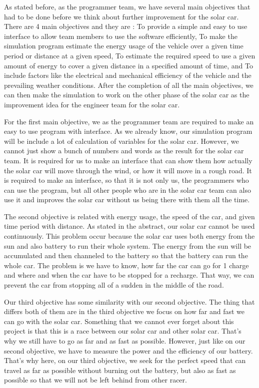 \documentclass[journal, 10pt, draftclsnofoot, onecolumn]{IEEEtran}
\begin{document}
	As stated before, as the programmer team, we have several main objectives that had to be done before we think about further improvement for the solar car. There are 4 main objectives and they are : To provide a simple and easy to use interface to allow team members to use the software efficiently, To make the simulation program estimate the energy usage of the vehicle over a given time period or distance at a given speed, To estimate the required speed to use a given amount of energy to cover a given distance in a specified amount of time, and To include factors like the electrical and mechanical efficiency of the vehicle and the prevailing weather conditions. After the completion of all the main objectives, we can then make the simulation to work on the other phase of the solar car as the improvement idea for the engineer team for the solar car. 

	For the first main objective, we as the programmer team are required to make an easy to use program with interface. As we already know, our simulation program will be include a lot of calculation of variables for the solar car. However, we cannot just show a bunch of numbers and words as the result for the solar car team. It is required for us to make an interface that can show them how actually the solar car will move through the wind, or how it will move in a rough road. It is required to make an interface, so that it is not only us, the programmers who can use the program, but all other people who are in the solar car team can also use it and improves the solar car without us being there with them all the time. 

	The second objective is related with energy usage, the speed of the car, and given time period with distance. As stated in the abstract, our solar car cannot be used continuously. This problem occur because the solar car uses both energy from the sun and also battery to run their whole system. The energy from the sun will be accumulated and then channeled to the battery so that the battery can run the whole car. The problem is we have to know, how far the car can go for 1 charge and where and when the car have to be stopped for a recharge. That way, we can prevent the car from stopping all of a sudden in the middle of the road. 
	
	Our third objective has some similarity with our second objective. The thing that differs both of them are in the third objective we focus on how far and fast we can go with the solar car. Something that we cannot ever forget about this project is that this is a race between our solar car and other solar car. That’s why we still have to go as far and as fast as possible. However, just like on our second objective, we have to measure the power and the efficiency of our battery. That’s why here, on our third objective, we seek for the perfect speed that can travel as far as possible without burning out the battery, but also as fast as possible so that we will not be left behind from other racer. 
\end{document}
